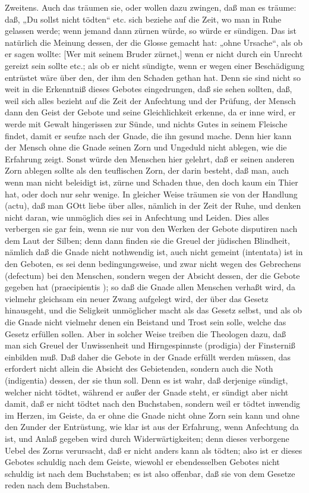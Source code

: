 Zweitens. Auch das träumen sie, oder wollen dazu zwingen, daß man es träume: daß, „Du sollst nicht tödten“ etc. sich beziehe auf die Zeit, wo man in Ruhe gelassen werde; wenn jemand dann zürnen würde, so würde er sündigen. Das ist natürlich die Meinung dessen, der die Glosse gemacht hat: „ohne Ursache“, als ob er sagen wollte: [Wer mit seinem Bruder zürnet,] wenn er nicht durch ein Unrecht gereizt sein sollte etc.; als ob er nicht sündigte, wenn er wegen einer Beschädigung entrüstet wäre über den, der ihm den Schaden gethan hat. Denn sie sind nicht so weit in die Erkenntniß dieses Gebotes eingedrungen, daß sie sehen sollten, daß, weil sich alles bezieht auf die Zeit der Anfechtung und der Prüfung, der Mensch dann den Geist der Gebote und seine Gleichlichkeit erkenne, da er inne wird, er werde mit Gewalt hingerissen zur Sünde, und nichts Gutes in seinem Fleische findet, damit er seufze nach der Gnade, die ihn gesund mache. Denn hier kann der Mensch ohne die Gnade seinen Zorn und Ungeduld nicht ablegen, wie die Erfahrung zeigt. Sonst würde den Menschen hier gelehrt, daß er seinen anderen Zorn ablegen sollte als den teuflischen Zorn, der darin besteht, daß man, auch wenn man nicht beleidigt ist, zürne und Schaden thue, den doch kaum ein Thier hat, oder doch nur sehr wenige. In gleicher Weise träumen sie von der Handlung (actu), daß man GOtt liebe über alles, nämlich in der Zeit der Ruhe, und denken nicht daran, wie unmöglich dies sei in Anfechtung und Leiden. Dies alles verbergen sie gar fein, wenn sie nur von den Werken der Gebote disputiren nach dem Laut der Silben; denn dann finden sie die Greuel der jüdischen Blindheit, nämlich daß die Gnade nicht nothwendig ist, auch nicht gemeint (intentata) ist in den Geboten, es sei denn bedingungsweise, und zwar nicht wegen des Gebrechens (defectum) bei den Menschen, sondern wegen der Absicht dessen, der die Gebote gegeben hat (praecipientis
); so daß die Gnade allen Menschen verhaßt wird, da vielmehr gleichsam ein neuer Zwang aufgelegt wird, der über das Gesetz hinausgeht, und die Seligkeit unmöglicher macht als das Gesetz selbst, und als ob die Gnade nicht vielmehr denen ein Beistand und Trost sein solle, welche das Gesetz erfüllen sollen. Aber in solcher Weise treiben die Theologen dazu, daß man sich Greuel der Unwissenheit und Hirngespinnste (prodigia) der Finsterniß einbilden muß. Daß daher die Gebote in der Gnade erfüllt werden müssen, das erfordert nicht allein die Absicht des Gebietenden, sondern auch die Noth (indigentia) dessen, der sie thun soll. Denn es ist wahr, daß derjenige sündigt, welcher nicht tödtet, während er außer der Gnade steht, er sündigt aber nicht damit, daß er nicht tödtet nach den Buchstaben, sondern weil er tödtet inwendig im Herzen, im Geiste, da er ohne die Gnade nicht ohne Zorn sein kann und ohne den Zunder der Entrüstung, wie klar ist aus der Erfahrung, wenn Anfechtung da ist, und Anlaß gegeben wird durch Widerwärtigkeiten; denn dieses verborgene Uebel des Zorns verursacht, daß er nicht anders kann als tödten; also ist er dieses Gebotes schuldig nach dem Geiste, wiewohl er ebendesselben Gebotes nicht schuldig ist nach dem Buchstaben; es ist also offenbar, daß sie von dem Gesetze reden nach dem Buchstaben.

